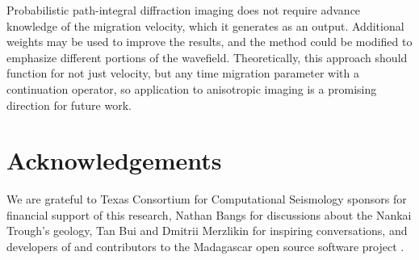 Probabilistic path-integral diffraction imaging does not require advance knowledge of the migration velocity, which it generates as an output.  Additional weights may be used to improve the results, and the method could be modified to emphasize different portions of the wavefield.  Theoretically, this approach should function for not just velocity, but any time migration parameter with a continuation operator, so application to anisotropic imaging is a promising direction for future work.

\section{Acknowledgements}
We are grateful to Texas Consortium for Computational Seismology sponsors for financial support of this research, Nathan Bangs for discussions about the Nankai Trough's geology, Tan Bui and Dmitrii Merzlikin for inspiring conversations, and developers of and contributors to the Madagascar open source software project \cite[]{madagascar}.
\onecolumn



